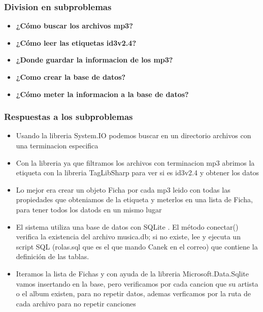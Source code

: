 \documentclass{article}
\begin{document}
\subsubsection{Division en subproblemas}

\begin{itemize}
    \item \textbf{¿Cómo buscar los archivos mp3?}

    \item \textbf{¿Cómo leer las etiquetas id3v2.4?}

    \item \textbf{¿Donde guardar la informacion de los mp3?}

    \item \textbf{¿Como crear la base de datos?}

    \item \textbf{¿Cómo meter la informacion a la base de datos?}

\end{itemize}

\subsubsection{Respuestas a los subproblemas}

\begin{itemize}
    \item Usando la libreria System.IO podemos buscar en un directorio archivos con una terminacion especifica

    \item Con la libreria ya que filtramos los archivos con terminacion mp3 abrimos la etiqueta con la libreria TagLibSharp \cite{taglibsharp} para ver si es id3v2.4 y obtener los datos
    
    \item Lo mejor era crear un objeto Ficha por cada mp3 leido con todas las propiedades que obteniamos de la etiqueta y meterlos en una lista de Ficha, para tener todos los datods en un mismo lugar
    
    \item El sistema utiliza una base de datos con SQLite \cite{sqlite}. El método conectar() verifica la existencia del archivo musica.db; si no existe, lee y ejecuta un script SQL (rolas.sql que es el que mando Canek en el correo) que contiene la definición de las tablas.
    
    \item Iteramos la lista de Fichas y con ayuda de la libreria Microsoft.Data.Sqlite \cite{microsoftsqlite} vamos insertando en la base, pero verificamos por cada cancion que su artista o el album existen, para no repetir datos, ademas verficamos por la ruta de cada archivo para no repetir canciones

\end{itemize}
\end{document}
